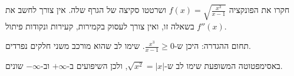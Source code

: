 
\begin{question}
חקרו את הפונקציה $f(x)=\sqrt{\frac{x^3}{x-1}}$ ושרטטו סקיצה של הגרף שלה. אין צורך לחשב את $f''(x)$ בשאלה זו, ואין צורך לעסוק בקמירות, קעירות ונקודות פיתול.
\end{question}

\begin{hint}
תחום ההגדרה: היכן ש-$\frac{x^3}{x-1}\ge0$. שימו לב שהוא מורכב משני חלקים נפרדים.
\end{hint}

\begin{hint}
באסימפטוטה המשופעת שימו לב ש-$\sqrt{x^2}=|x|$, ולכן השיפועים ב-$+\infty$ וב-$-\infty$ שונים.
\end{hint}

